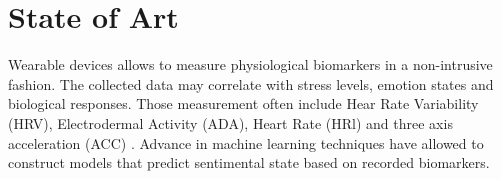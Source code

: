 \section{State of Art}


Wearable devices allows to measure physiological biomarkers in a non-intrusive fashion. The collected data may correlate with stress levels, emotion states and biological responses. Those measurement often include Hear Rate Variability (HRV), Electrodermal Activity (ADA), Heart Rate (HRl) and three axis acceleration (ACC) \cite{Vos2023}. Advance in machine learning techniques have allowed to construct models that predict sentimental state based on recorded biomarkers.